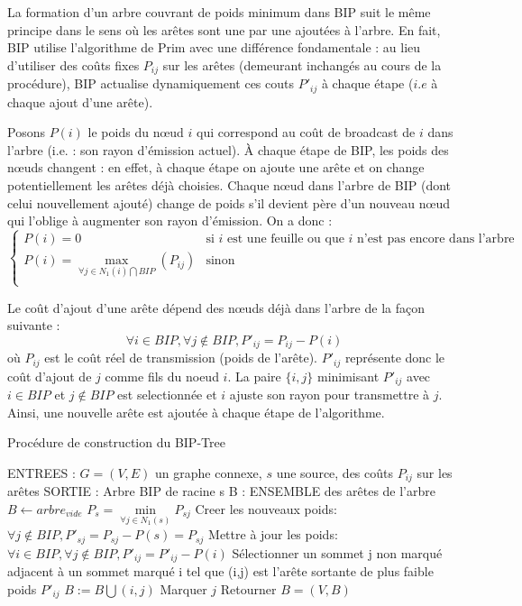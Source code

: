 La formation d'un arbre couvrant de poids minimum dans BIP suit le même principe dans le sens où les arêtes sont une par une ajoutées à l'arbre. En fait, BIP utilise l'algorithme de Prim avec une différence fondamentale : au lieu d'utiliser des coûts fixes $P_{ij}$ sur les arêtes (demeurant inchangés au cours de la procédure), BIP actualise dynamiquement ces couts $P'_{ij}$ à chaque étape ($i.e$ à chaque ajout d'une arête).

Posons $P(i)$ le poids du nœud $i$ qui correspond au coût de broadcast de $i$ dans l'arbre (i.e. : son rayon d'émission actuel). À chaque étape de BIP, les poids des nœuds changent : en effet, à chaque étape on ajoute une arête et on change potentiellement les arêtes déjà choisies. Chaque nœud dans l'arbre de BIP (dont celui nouvellement ajouté) change de poids s'il devient père d'un nouveau nœud qui l'oblige à augmenter son rayon d'émission. On a donc :
$$\begin{cases}
	P(i)=0  & \text{si $i$ est une feuille ou que $i$ n'est pas encore dans l'arbre}\\
	P(i)=\max\limits_{\forall j\in N_1(i)\bigcap BIP}(P_{ij}) & \text{sinon}\\
\end{cases}$$

Le coût d'ajout d'une arête dépend des nœuds déjà dans l'arbre de la façon suivante : 
$$ \forall i \in BIP, \forall j \notin BIP, P'_{ij}=P_{ij}-P(i)$$
où $P_{ij}$ est le coût réel de transmission (poids de l'arête). $P'_{ij}$ représente donc le coût d'ajout de $j$ comme fils du noeud $i$. La paire $\{i,j\}$ minimisant $P'_{ij}$ avec $i \in BIP$ et $j \not\in BIP$ est selectionnée et $i$ ajuste son rayon pour transmettre à $j$. Ainsi, une nouvelle arête est ajoutée à chaque étape de l'algorithme.\\


\begin{algorithm}[h]
\caption{Procédure de construction du BIP-Tree}
\label{algo_BIP_tree}
\begin{algorithmic}
\STATE ENTREES :  $G=(V,E)$ un graphe connexe, $s$ une source, des coûts $P_{ij}$ sur les arêtes 
\STATE SORTIE : Arbre BIP de racine s
\STATE B : ENSEMBLE des arêtes de l'arbre
\STATE  $B \leftarrow arbre_{vide}$
\STATE $P_s = \min \limits_{\forall j \in N_1(s)}{P_{sj}}$
\STATE Creer les nouveaux poids: $\forall j \notin BIP, P'_{sj}=P_{sj}-P(s)=P_{sj}$
   \STATE Mettre à jour les poids:  $ \forall i \in BIP, \forall j \notin BIP, P'_{ij}=P'_{ij}-P(i)$
   \STATE Sélectionner un sommet j non marqué adjacent à un sommet marqué i tel que (i,j) est l'arête sortante de plus faible poids $P'_{ij}$
   \STATE $B := B\bigcup   {(i,j)}$
   \STATE Marquer $j$
\ENDWHILE
\STATE Retourner $B=(V,B)$
\end{algorithmic}
\end{algorithm}

